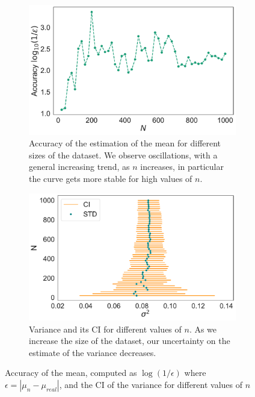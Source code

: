 \documentclass[twoside,onecolumn]{article}
\theoremstyle{definition}
\begin{document}
\begin{figure} \centering
\begin{subfigure}{0.45\textwidth}
         \includegraphics[width=\textwidth]{../figs/unif_mean_accuracy.pdf}
         \caption{Accuracy of the estimation of the mean for different sizes of the dataset. We observe oscillations, with a general increasing trend, as $n$ increases, in particular the curve gets more stable for high values of $n$.}\label{fig:N_unif_acc}
     \end{subfigure}
     \begin{subfigure}{0.5\textwidth}
         \includegraphics[width=\textwidth]{../figs/unif_variance_CI.pdf}
         \caption{Variance and its CI for different values of $n$. As we increase the size of the dataset, our uncertainty on the estimate of the variance decreases.}
         \label{fig:N_unif_var}
     \end{subfigure}
  \caption{Accuracy of the mean, computed as $\log(1/\epsilon)$ where $\epsilon=|\mu_n-\mu_{real}|$, and the CI of the variance for different values of $n$}\label{fig:N_unif}
\end{figure}
\end{document}
